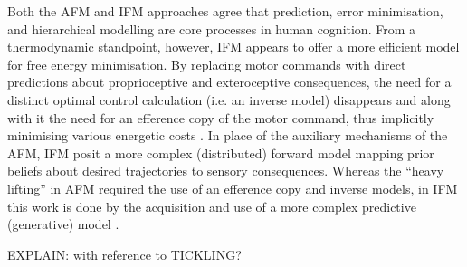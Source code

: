 \begin{CJK}{UTF8}{gbsn}
Both the AFM and IFM approaches agree that prediction, error minimisation, and hierarchical modelling are core processes in human cognition. From a thermodynamic standpoint, however, IFM appears to offer a more efficient model for free energy minimisation.  By replacing motor commands with direct predictions about proprioceptive and exteroceptive consequences, the need for a distinct optimal control calculation (i.e. an inverse model) disappears and along with it the need for an efference copy of the motor command, thus implicitly minimising various energetic costs \citep{Pickering2014,Friston2010}.   In place of the auxiliary mechanisms of the AFM, IFM posit a more complex (distributed) forward model mapping prior beliefs about desired trajectories to sensory consequences.  Whereas the ``heavy lifting'' in AFM required the use of an efference copy and inverse models, in IFM this work is done by the acquisition and use of a more complex predictive (generative) model \citep{Pickering2014}.


EXPLAIN: with reference to TICKLING?








\end{CJK}
